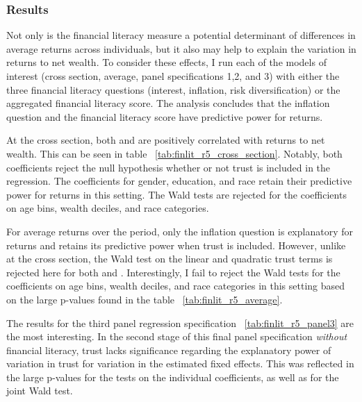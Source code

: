 \label{tab:finlit_trust_corr}
\FloatBarrier

\subsubsection{Results}

\par Not only is the financial literacy measure a potential determinant of differences in average returns across individuals, but it also may help to explain the variation in returns to net wealth. To consider these effects, I run each of the models of interest (cross section, average, panel specifications 1,2, and 3) with either the three financial literacy questions (interest, inflation, risk diversification) or the aggregated financial literacy score. The analysis concludes that the inflation question and the financial literacy score have predictive power for returns.

\par At the cross section, both  and  are positively correlated with returns to net wealth. This can be seen in table ~\ref{tab:finlit_r5_cross_section}. Notably, both coefficients reject the null hypothesis whether or not trust is included in the regression. The coefficients for gender, education, and race retain their predictive power for returns in this setting. The Wald tests are rejected for the coefficients on age bins, wealth deciles, and race categories.  

\label{tab:finlit_r5_cross_section}
\FloatBarrier

\par For average returns over the period, only the inflation question is explanatory for returns and retains its predictive power when trust is included. However, unlike at the cross section, the Wald test on the linear and quadratic trust terms is rejected here for both  and . Interestingly, I fail to reject the Wald tests for the coefficients on age bins, wealth deciles, and race categories in this setting based on the large p-values found in the table ~\ref{tab:finlit_r5_average}. 

\label{tab:finlit_r5_average}
\FloatBarrier

\par The results for the third panel regression specification ~\ref{tab:finlit_r5_panel3} are the most interesting. In the second stage of this final panel specification \textit{without} financial literacy, trust lacks significance regarding the explanatory power of variation in trust for variation in the estimated fixed effects. This was reflected in the large p-values for the tests on the individual coefficients, as well as for the joint Wald test.

